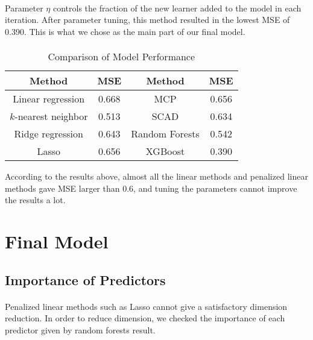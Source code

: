 \documentclass[paper=a4, fontsize=11pt]{scrartcl} %
\numberwithin{equation}{section} %
\numberwithin{figure}{section} %
\numberwithin{table}{section} %
\begin{document}
{\paragraph{}
Parameter \(\eta\) controls the fraction of the new learner added to the model in each iteration. After parameter tuning, this method resulted in the lowest MSE of 0.390. This is what we chose as the main part of our final model.


\paragraph{}
\begin{table}[ht]
\caption{Comparison of Model Performance} %
\centering %
\small
\begin{tabular}{c c || c c} %

\hline %
Method & MSE & Method & MSE\\ [.5ex]
\hline
Linear regression & 0.668 & MCP & 0.656\\
\hline
\(k\)-nearest neighbor & 0.513 & SCAD & 0.634\\
\hline
Ridge regression & 0.643 & Random Forests & 0.542\\
\hline
Lasso & 0.656 & XGBoost & 0.390 \\ [1ex]
\hline %
\end{tabular}
\end{table}

According to the results above, almost all the linear methods and penalized linear methods gave MSE larger than 0.6, and tuning the parameters cannot improve the results a lot.

%
%
\section{Final Model}
\subsection{Importance of Predictors}
\paragraph{}
Penalized linear methods such as Lasso cannot give a satisfactory dimension reduction. In order to reduce dimension, we checked the importance of each predictor given by random forests result. 
}
\end{document}
